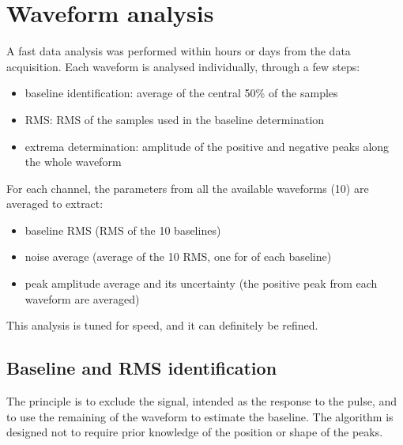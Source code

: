 \section{Waveform analysis}
\label{sec:Analysis}

A fast data analysis was performed within hours or days from the data
acquisition. Each waveform is analysed individually, through a few
steps:
\begin{itemize}
  \item
    baseline identification: average of the central 50\% of the samples
  \item
    RMS: RMS of the samples used in the baseline determination
  \item
    extrema determination: amplitude of the positive and negative peaks
    along the whole waveform
\end{itemize}
For each channel, the parameters from all the available waveforms (10)
are averaged to extract:
\begin{itemize}
  \item
    baseline RMS (RMS of the 10 baselines)
  \item
    noise average (average of the 10 RMS, one for of each baseline)
  \item
    peak amplitude average and its uncertainty (the positive
    peak from each waveform are averaged)
\end{itemize}
This analysis is tuned for speed, and it can definitely be refined.



\subsection{Baseline and RMS identification}
\label{sec:baseline-and-rms-identification}


The principle is to exclude the signal, intended as the response to the
pulse, and to use the remaining of the waveform to estimate the
baseline. The algorithm is designed not to require prior knowledge of
the position or shape of the peaks.

